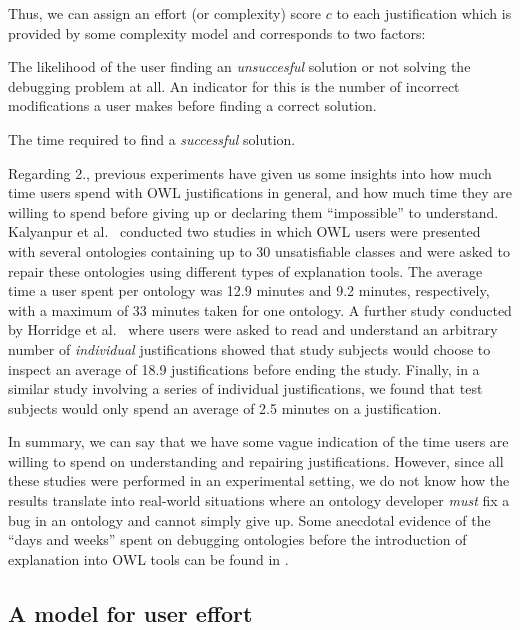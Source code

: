 Thus, we can assign an effort (or complexity) score $c$ to each justification which is provided by some complexity model and corresponds to two factors:
\begin{compactenum}
\item The likelihood of the user finding an \emph{unsuccesful} solution or not solving the debugging problem at all. An indicator for this is the number of incorrect modifications a user makes before finding a correct solution.
\item The time required to find a \emph{successful} solution.
\end{compactenum}

Regarding 2., previous experiments have given us some insights into how much time users spend with OWL justifications in general, and how much time they are willing to spend before giving up or declaring them \enquote{impossible} to understand. Kalyanpur et al.\ \cite{kalyanpur05mi,kalyanpur06nm} conducted two studies in which OWL users were presented with several ontologies containing up to 30 unsatisfiable classes and were asked to repair these ontologies using different types of explanation tools. The average time a user spent per ontology was 12.9 minutes and 9.2 minutes, respectively, with a maximum of 33 minutes taken for one ontology. A further study conducted by Horridge et al.\ \cite{horridge09ct} where users were asked to read and understand an arbitrary number of \emph{individual} justifications showed that study subjects would choose to inspect an average of 18.9 justifications before ending the study. Finally, in a similar study \cite{horridge11gj} involving a series of individual justifications, we found that test subjects would only spend an average of 2.5 minutes on a justification.

In summary, we can say that we have some vague indication of the time users are willing to spend on understanding and repairing justifications. However, since all these studies were performed in an experimental setting, we do not know how the results translate into real-world situations where an ontology developer \emph{must} fix a bug in an ontology and cannot simply give up. Some anecdotal evidence of the \enquote{days and weeks} spent on debugging ontologies before the introduction of explanation into OWL tools can be found in \cite{allemang05aa}.

\subsection{A model for user effort}

